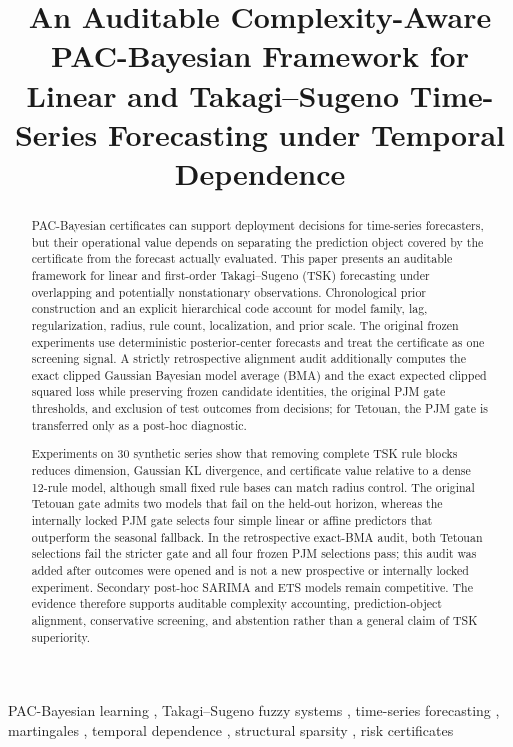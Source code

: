 \documentclass[preprint,12pt]{elsarticle}
\begin{document}
	
	\begin{frontmatter}
		
\title{
An Auditable Complexity-Aware PAC-Bayesian Framework for
Linear and Takagi--Sugeno Time-Series Forecasting under
Temporal Dependence
}
		
	
		
	\begin{abstract}
PAC-Bayesian certificates can support deployment decisions for time-series
forecasters, but their operational value depends on separating the prediction
object covered by the certificate from the forecast actually evaluated. This
paper presents an auditable framework for linear and first-order
Takagi--Sugeno (TSK) forecasting under overlapping and potentially
nonstationary observations. Chronological prior construction and an explicit
hierarchical code account for model family, lag, regularization, radius, rule
count, localization, and prior scale. The original frozen experiments use
deterministic posterior-center forecasts and treat the certificate as one
screening signal. A strictly retrospective alignment audit additionally
computes the exact clipped Gaussian Bayesian model average (BMA) and the exact
expected clipped squared loss while preserving frozen candidate identities,
the original PJM gate thresholds, and exclusion of test outcomes from decisions; for Tetouan, the PJM gate is transferred only as a post-hoc diagnostic.

Experiments on 30 synthetic series show that removing complete TSK rule blocks
reduces dimension, Gaussian KL divergence, and certificate value relative to a
dense 12-rule model, although small fixed rule bases can match radius control.
The original Tetouan gate admits two models that fail on the held-out horizon,
whereas the internally locked PJM gate selects four simple linear or affine
predictors that outperform the seasonal fallback. In the retrospective
exact-BMA audit, both Tetouan selections fail the stricter gate and all four
frozen PJM selections pass; this audit was added after outcomes were opened and
is not a new prospective or internally locked experiment. Secondary post-hoc SARIMA and ETS models
remain competitive. The evidence therefore supports auditable complexity
accounting, prediction-object alignment, conservative screening, and
abstention rather than a general claim of TSK superiority.
\end{abstract}
	
	
\begin{keyword}
PAC-Bayesian learning \sep
Takagi--Sugeno fuzzy systems \sep
time-series forecasting \sep
martingales \sep
temporal dependence \sep
structural sparsity \sep
risk certificates
\end{keyword}
		
	\end{frontmatter}
	
\end{document}
